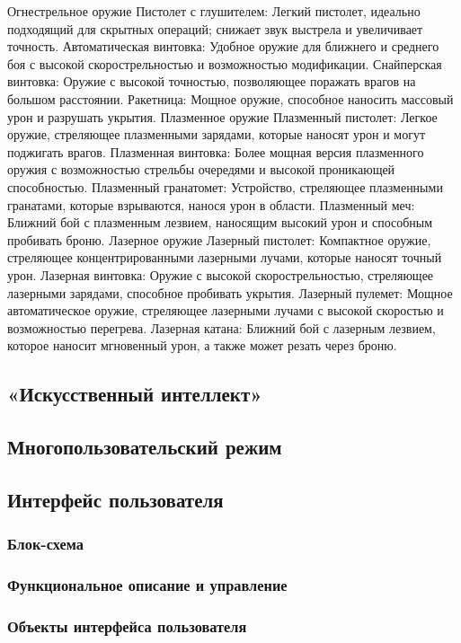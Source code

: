 \documentclass[a4paper,12pt]{article}
\begin{document}
Огнестрельное оружие
Пистолет с глушителем: Легкий пистолет, идеально подходящий для скрытных операций; снижает звук выстрела и увеличивает точность.
Автоматическая винтовка: Удобное оружие для ближнего и среднего боя с высокой скорострельностью и возможностью модификации.
Снайперская винтовка: Оружие с высокой точностью, позволяющее поражать врагов на большом расстоянии.
Ракетница: Мощное оружие, способное наносить массовый урон и разрушать укрытия.
Плазменное оружие
Плазменный пистолет: Легкое оружие, стреляющее плазменными зарядами, которые наносят урон и могут поджигать врагов.
Плазменная винтовка: Более мощная версия плазменного оружия с возможностью стрельбы очередями и высокой проникающей способностью.
Плазменный гранатомет: Устройство, стреляющее плазменными гранатами, которые взрываются, нанося урон в области.
Плазменный меч: Ближний бой с плазменным лезвием, наносящим высокий урон и способным пробивать броню.
Лазерное оружие
Лазерный пистолет: Компактное оружие, стреляющее концентрированными лазерными лучами, которые наносят точный урон.
Лазерная винтовка: Оружие с высокой скорострельностью, стреляющее лазерными зарядами, способное пробивать укрытия.
Лазерный пулемет: Мощное автоматическое оружие, стреляющее лазерными лучами с высокой скоростью и возможностью перегрева.
Лазерная катана: Ближний бой с лазерным лезвием, которое наносит мгновенный урон, а также может резать через броню.
\subsection{«Искусственный интеллект»}
\subsection{Многопользовательский режим}
\subsection{Интерфейс пользователя}
\subsubsection{Блок-схема}
\subsubsection{Функциональное описание и управление}
\subsubsection{Объекты интерфейса пользователя}
\end{document}
